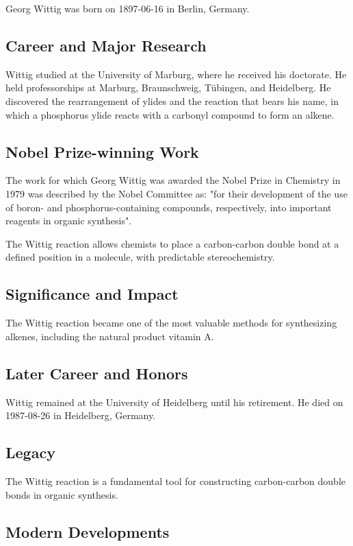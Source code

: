 Georg Wittig was born on 1897-06-16 in Berlin, Germany.

\subsection*{Career and Major Research}

Wittig studied at the University of Marburg, where he received his doctorate. He held professorships at Marburg, Braunschweig, Tübingen, and Heidelberg. He discovered the rearrangement of ylides and the reaction that bears his name, in which a phosphorus ylide reacts with a carbonyl compound to form an alkene.

\subsection*{Nobel Prize-winning Work}

The work for which Georg Wittig was awarded the Nobel Prize in Chemistry in 1979 was described by the Nobel Committee as: "for their development of the use of boron- and phosphorus-containing compounds, respectively, into important reagents in organic synthesis".

The Wittig reaction allows chemists to place a carbon-carbon double bond at a defined position in a molecule, with predictable stereochemistry.

\subsection*{Significance and Impact}

The Wittig reaction became one of the most valuable methods for synthesizing alkenes, including the natural product vitamin A.

\subsection*{Later Career and Honors}

Wittig remained at the University of Heidelberg until his retirement. He died on 1987-08-26 in Heidelberg, Germany.

\subsection*{Legacy}

The Wittig reaction is a fundamental tool for constructing carbon-carbon double bonds in organic synthesis.

\subsection*{Modern Developments}

